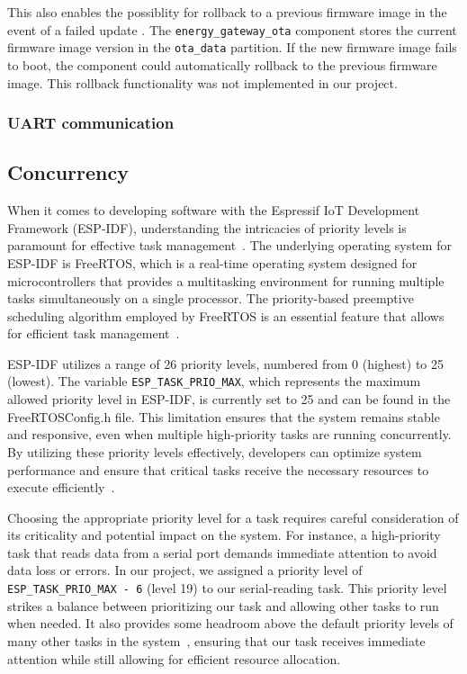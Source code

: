 This also enables the possiblity for rollback to a previous firmware image in the event of a failed update \cite{espressif:esp-idf-programming-guide}. The \texttt{energy\_gateway\_ota} component stores the current firmware image version in the \texttt{ota\_data} partition. If the new firmware image fails to boot, the component could automatically rollback to the previous firmware image. This rollback functionality was not implemented in our project.

\subsubsection{UART communication}

\subsection{Concurrency}

When it comes to developing software with the Espressif IoT Development Framework (ESP-IDF), understanding the intricacies of priority levels is paramount for effective task management~\cite{Davis:2016}. The underlying operating system for ESP-IDF is FreeRTOS, which is a real-time operating system designed for microcontrollers that provides a multitasking environment for running multiple tasks simultaneously on a single processor. The priority-based preemptive scheduling algorithm employed by FreeRTOS is an essential feature that allows for efficient task management~\cite{espressif:esp-idf-programming-guide}.

ESP-IDF utilizes a range of 26 priority levels, numbered from 0 (highest) to 25 (lowest). The variable \texttt{ESP\_TASK\_PRIO\_MAX}, which represents the maximum allowed priority level in ESP-IDF, is currently set to 25 and can be found in the FreeRTOSConfig.h file\cite{espressif:freertosconfig}. This limitation ensures that the system remains stable and responsive, even when multiple high-priority tasks are running concurrently. By utilizing these priority levels effectively, developers can optimize system performance and ensure that critical tasks receive the necessary resources to execute efficiently~\cite{espressif:esp-idf-programming-guide}.

Choosing the appropriate priority level for a task requires careful consideration of its criticality and potential impact on the system. For instance, a high-priority task that reads data from a serial port demands immediate attention to avoid data loss or errors. In our project, we assigned a priority level of \texttt{ESP\_TASK\_PRIO\_MAX - 6} (level 19) to our serial-reading task. This priority level strikes a balance between prioritizing our task and allowing other tasks to run when needed. It also provides some headroom above the default priority levels of many other tasks in the system~\cite{espressif:esp-idf-programming-guide}, ensuring that our task receives immediate attention while still allowing for efficient resource allocation.


